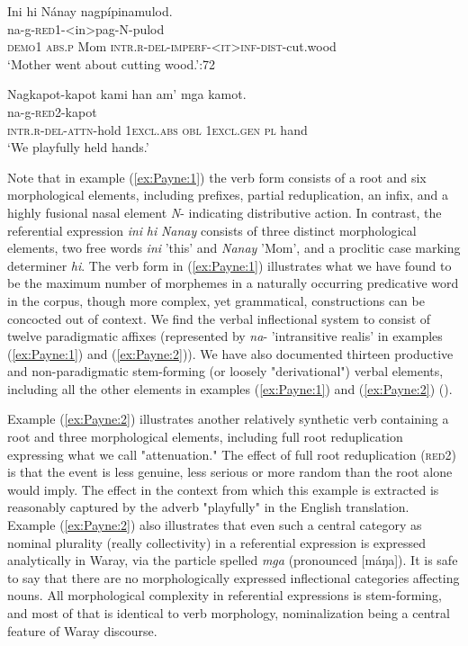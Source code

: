 \documentclass[output=paper]{langscibook}
\begin{document}
\ea 
\label{ex:Payne:1}
\glll Ini hi Nánay nagpípinamulod.\\
      {} {} {}  na-g-\textsc{red}1-<in>pag-N-pulod\\
       \textsc{demo1} \textsc{abs.p} Mom \textsc{intr.r-del-imperf-<it>inf-dist}{}-cut.wood \\
\glt ‘Mother went about cutting wood.'\citep[72]{Alunan2016}:72
\z

\ea\label{ex:Payne:2}
\glll Nagkapot-kapot  kami  han  am'  mga  kamot.\\
na-g-\textsc{red}2-kapot\\
\textsc{intr.r-del-attn}{}-hold  1\textsc{excl.abs}  \textsc{obl} 1\textsc{excl.gen} \textsc{pl}  hand \\
\glt ‘We playfully held hands.'
\z

Note that in example (\ref{ex:Payne:1}) the verb form consists of a root and six morphological elements, including prefixes, partial reduplication, an infix, and a highly fusional nasal element \textit{N}{}- indicating distributive action. In contrast, the referential expression \textit{ini} \textit{hi} \textit{Nanay} consists of three distinct morphological elements, two free words \textit{ini} 'this' and \textit{Nanay} 'Mom', and a proclitic case marking determiner \textit{hi}. The verb form in (\ref{ex:Payne:1}) illustrates what we have found to be the maximum number of morphemes in a naturally occurring predicative word in the corpus, though more complex, yet grammatical, constructions can be concocted out of context. We find the verbal inflectional system to consist of twelve paradigmatic affixes (represented by \textit{na}{}- 'intransitive realis' in examples (\ref{ex:Payne:1}) and (\ref{ex:Payne:2})). We have also documented thirteen productive and non-paradigmatic stem-forming (or loosely "derivational") verbal elements, including all the other elements in examples (\ref{ex:Payne:1}) and (\ref{ex:Payne:2}) (\citet{OyzonPayneinprep}).

Example (\ref{ex:Payne:2}) illustrates another relatively synthetic verb containing a root and three morphological elements, including full root reduplication expressing what we call "attenuation." The effect of full root reduplication (\textsc{red}2) is that the event is less genuine, less serious or more random than the root alone would imply. The effect in the context from which this example is extracted is reasonably captured by the adverb "playfully" in the English translation. Example (\ref{ex:Payne:2}) also illustrates that even such a central category as nominal plurality (really collectivity) in a referential expression is expressed analytically in Waray, via the particle spelled \textit{mga} (pronounced [máŋa]). It is safe to say that there are no morphologically expressed inflectional categories affecting nouns. All morphological complexity in referential expressions is stem-forming, and most of that is identical to verb morphology, nominalization being a central feature of Waray discourse.
\end{document}
